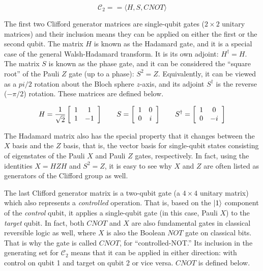 \begin{equation}
\mathcal{C}_2 = = \langle H, S, CNOT \rangle
\end{equation}

The first two Clifford generator matrices are single-qubit gates ($2 \times 2$ unitary matrices) and
their inclusion means they can be applied on either the first or the second
qubit.
The matrix $H$ is known as the Hadamard gate, and it is a special case of the
general Walsh-Hadamard transform. It is its own adjoint: $H^{\dagger} = H$.
The matrix $S$ is known as the phase gate, and it can be considered the
``square root'' of the Pauli $Z$ gate (up to a phase): $S^2 = Z$.
Equivalently, it can be viewed as a $pi/2$ rotation about the Bloch sphere
$z$-axis, and its adjoint $S^{\dagger}$ is the reverse ($-\pi /2$) rotation.
These matrices are defined below.

\begin{displaymath}
H = \frac{1}{\sqrt{2}}
 \left[
  \begin{array}{cc}
    1 & 1 \\
    1 & -1 \\
  \end{array} \right]
\qquad
S = 
 \left[
  \begin{array}{cc}
    1 & 0 \\
    0 & i \\
  \end{array} \right]
\qquad
S^{\dagger} = 
 \left[
  \begin{array}{cc}
    1 & 0 \\
    0 & -i \\
  \end{array} \right]
\end{displaymath}

The Hadamard matrix also has the special property that it changes between the
$X$ basis and the $Z$ basis, that is, the vector basis for single-qubit
states consisting of eigenstates of the Pauli $X$ and Pauli $Z$ gates,
respectively. In fact, using the identities $X = HZH$ and $S^2 = Z$, it
is easy to see why $X$ and $Z$ are often listed as generators of the
Clifford group as well.

The last Clifford generator matrix is a two-qubit gate (a $4 \times 4$ unitary matrix) which
also represents a \emph{controlled} operation. That is, based on the
$\left\vert{1}\right\rangle$ component of the \emph{control} qubit, it applies a single-qubit
gate (in this case, Pauli $X$) to the \emph{target} qubit.
In fact,
both $CNOT$ and $X$ are also fundamental gates in classical reversible
logic as well, where $X$ is also the Boolean $NOT$ gate on classical bits.
That is why the gate is called $CNOT$, for ``controlled-NOT.'' Its inclusion
in the generating set for $\mathcal{C}_2$ means that it can be applied
in either direction: with control on qubit 1 and target on qubit 2 or
vice versa. $CNOT$ is defined below.

